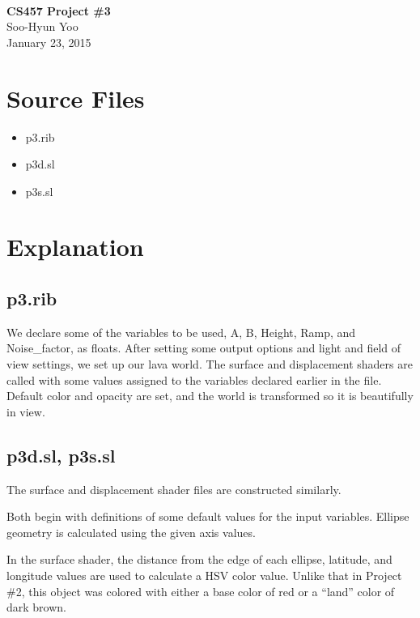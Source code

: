\documentclass[12pt,letterpaper]{article}
\begin{document}
\fancyfoot{}
\begin{center}
    \hfill \\
    \vspace{4in}
    {\bf\Huge CS457 Project \#3 \\}
    \vspace{2in}
    {\Large Soo-Hyun Yoo \\ January 23, 2015}
\end{center}

\newpage
{}

\section*{Source Files}

\begin{itemize}
    \item p3.rib
    \item p3d.sl
    \item p3s.sl
\end{itemize}


\section*{Explanation}

\subsection*{p3.rib}

We declare some of the variables to be used, A, B, Height, Ramp, and
Noise\_factor, as floats. After setting some output options and light and field
of view settings, we set up our lava world. The surface and displacement
shaders are called with some values assigned to the variables declared earlier
in the file. Default color and opacity are set, and the world is transformed so
it is beautifully in view.


\subsection*{p3d.sl, p3s.sl}

The surface and displacement shader files are constructed similarly.

Both begin with definitions of some default values for the input variables.
Ellipse geometry is calculated using the given axis values.

In the surface shader, the distance from the edge of each ellipse, latitude,
and longitude values are used to calculate a HSV color value. Unlike that in
Project \#2, this object was colored with either a base color of red or
a ``land'' color of dark brown.
\end{document}
